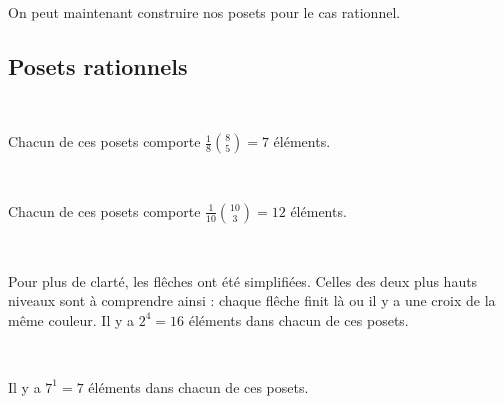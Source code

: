 On peut maintenant construire nos posets pour le cas rationnel.

\subsection{Posets rationnels}

\begin{expl}
    ~\\
    \begin{center}
        
        Chacun de ces posets comporte $\frac {1}{8} \binom{8}{5} = 7$
        éléments.
    \end{center}
\end{expl}

\begin{expl}
    ~\\
    \begin{center}
        
        Chacun de ces posets comporte $\frac {1}{10} \binom{10}{3} = 12$
        éléments.
    \end{center}
\end{expl}

\begin{expl}
    ~\\
    \begin{center}
        
        Pour plus de clarté, les flêches ont été simplifiées.
        Celles des deux plus hauts niveaux sont à comprendre ainsi :
        chaque flêche finit là ou il y a une croix de la même couleur.
        Il y a  $2^4 = 16$ éléments dans chacun de ces posets.
    \end{center}
\end{expl}


\begin{expl}
    ~\\
    \begin{center}
        
        Il y a $7^1 = 7$ éléments dans chacun de ces posets.
    \end{center}
\end{expl}